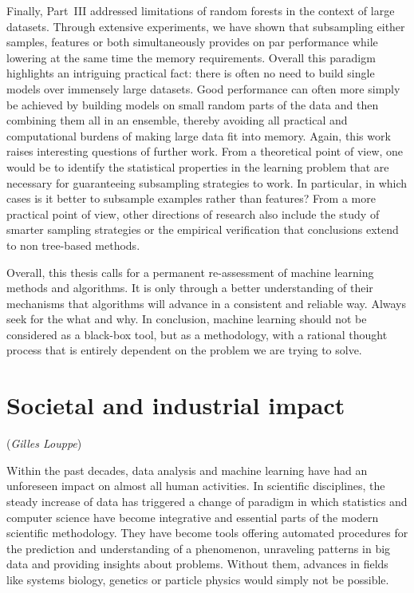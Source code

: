 Finally, Part~\textsc{III} addressed limitations of random forests in
the context of large datasets. Through extensive experiments, we have shown
that subsampling either samples, features or both simultaneously provides on
par performance while lowering at the same time the memory requirements.
Overall this paradigm highlights an intriguing practical fact: there is often
no need to build single models over immensely large datasets. Good performance
can often more simply be achieved by building models on small random parts of the
data and then combining them all in an ensemble, thereby avoiding all practical and
computational burdens of making large data fit into memory. Again, this work
raises interesting questions of further work. From a theoretical point of view,
one would be to identify the statistical properties in the learning problem
that are necessary for guaranteeing subsampling strategies to work. In
particular, in which cases is it better to subsample examples rather than
features? From a more practical point of view, other directions of research
also include the study of smarter sampling strategies or the empirical
verification that conclusions extend to non tree-based methods.

Overall, this thesis calls for a permanent re-assessment of machine learning
methods and algorithms. It is only through a better understanding of their
mechanisms that algorithms will advance in a consistent and reliable way.
Always seek for the what and why. In conclusion, machine learning should not be
considered as a black-box tool, but as a methodology, with a rational thought
process that is entirely dependent on the problem we are trying to solve.


\chapter{Societal and industrial impact}

\vspace{-3.5em}
\hfill (\textit{Gilles Louppe})
\vspace{2.5em}



Within the past decades, data analysis and machine learning have had an
unforeseen impact on almost all human activities. In scientific disciplines,
the steady increase of data has triggered a change of paradigm in which
statistics and computer science have become integrative and essential parts
of the modern scientific methodology. They have become tools offering automated
procedures for the prediction and understanding of a phenomenon, unraveling
patterns in big data and providing insights about problems. Without them,
advances in fields like systems biology, genetics or particle physics would
simply not be possible.

